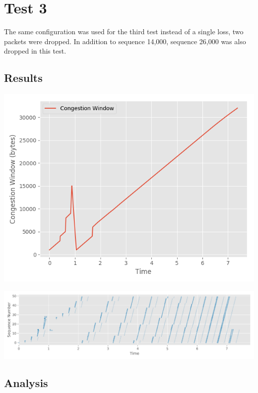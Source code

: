 \documentclass[fleqn,11pt]{article}
\begin{document}
	\section{Test 3}
	
	The same configuration was used for the third test instead of a single loss, two packets were dropped.
	In addition to sequence 14,000, sequence 26,000 was also dropped in this test.
	
	\subsection{Results}
	
	{
		\centering
		\includegraphics[]{cwnd3}
		
		\includegraphics[width=17cm]{sequence3}
		
	}
	
	\subsection{Analysis}
	
\end{document}
